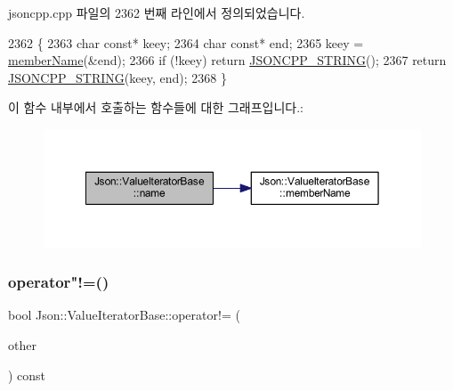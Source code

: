 jsoncpp.\+cpp 파일의 2362 번째 라인에서 정의되었습니다.


\begin{DoxyCode}
2362                                              \{
2363   \textcolor{keywordtype}{char} \textcolor{keyword}{const}* keey;
2364   \textcolor{keywordtype}{char} \textcolor{keyword}{const}* end;
2365   keey = \hyperlink{class_json_1_1_value_iterator_base_a54765da6759fd3f1edcbfbaf308ec263}{memberName}(&end);
2366   \textcolor{keywordflow}{if} (!keey) \textcolor{keywordflow}{return} \hyperlink{json-forwards_8h_a1e723f95759de062585bc4a8fd3fa4be}{JSONCPP\_STRING}();
2367   \textcolor{keywordflow}{return} \hyperlink{json-forwards_8h_a1e723f95759de062585bc4a8fd3fa4be}{JSONCPP\_STRING}(keey, end);
2368 \}
\end{DoxyCode}
이 함수 내부에서 호출하는 함수들에 대한 그래프입니다.\+:
\nopagebreak
\begin{figure}[H]
\begin{center}
\leavevmode
\includegraphics[width=350pt]{class_json_1_1_value_iterator_base_a522989403c976fdbb94da846b99418db_cgraph}
\end{center}
\end{figure}
\mbox{\label{class_json_1_1_value_iterator_base_aa83bdcc8114b7d040eb8eb42eeed5f4a}} 
\subsubsection{\texorpdfstring{operator"!=()}{operator!=()}}
{\footnotesize\ttfamily bool Json\+::\+Value\+Iterator\+Base\+::operator!= (\begin{DoxyParamCaption}\item[{const \hyperlink{class_json_1_1_value_iterator_base_a9d2a940d03ea06d20d972f41a89149ee}{Self\+Type} \&}]{other }\end{DoxyParamCaption}) const\hspace{0.3cm}{\ttfamily [inline]}}



